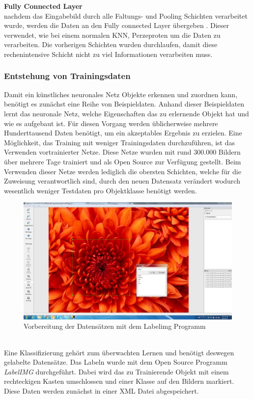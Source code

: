 \documentclass[a4paper,12pt,oneside]{article}
\begin{document}
\textbf{Fully Connected Layer}\\
nachdem das Eingabebild durch alle Faltungs- und Pooling Schichten verarbeitet wurde, werden die Daten an den Fully connected Layer übergeben \cite[14]{sermanet2012convolutional}. Dieser verwendet, wie bei einem normalen KNN, Perzeproten um die Daten zu verarbeiten. Die vorherigen Schichten wurden durchlaufen, damit diese rechenintensive Schicht nicht zu viel Informationen verarbeiten muss. 
  \subsubsection{Entstehung von Trainingsdaten}\label{s.trainingsdaten} 
Damit ein künstliches neuronales Netz Objekte erkennen und zuordnen kann, benötigt es zunächst eine Reihe von Beispieldaten. Anhand dieser Beispieldaten lernt das neuronale Netz, welche Eigenschaften das zu erlernende Objekt hat und wie es aufgebaut ist. Für diesen Vorgang werden üblicherweise mehrere Hunderttausend Daten benötigt, um ein akzeptables Ergebnis zu erzielen. Eine Möglichkeit, das Training mit weniger Trainingsdaten durchzuführen, ist das Verwenden vortrainierter Netze. Diese Netze wurden mit rund 300.000 Bildern über mehrere Tage trainiert und als Open Source zur Verfügung gestellt. Beim Verwenden dieser Netze werden lediglich die obersten Schichten, welche für die Zuweisung verantwortlich sind, durch den neuen Datensatz verändert wodurch wesentlich weniger Testdaten pro Objektklasse benötigt werden. 
\begin{figure}
	[h]
	\centering
	\includegraphics[scale=0.7]{Sources/labelimg.jpg}
	\caption{Vorbereitung der Datensätzen mit dem Labelimg Programm \cite{labelimg2019}}
	\label{img:labelimg}
\end{figure}\\
Eine Klassifizierung gehört zum überwachten Lernen und benötigt deswegen gelabelte Datensätze. Das Labeln wurde mit dem Open Source Programm \textit{LabelIMG} \cite{labelimg2019} durchgeführt. Dabei wird das zu Trainierende Objekt mit einem rechteckigen Kasten umschlossen und einer Klasse auf den Bildern markiert. Diese Daten werden zunächst in einer XML Datei abgespeichert. 
\end{document}
